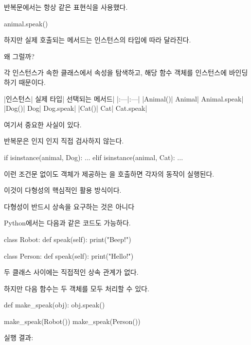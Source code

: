 반복문에서는 항상 같은 표현식을 사용했다.

\begin{dhkcode}
animal.speak()
\end{dhkcode}

하지만 실제 호출되는 메서드는 인스턴스의 타입에 따라 달라진다.

왜 그럴까?

각 인스턴스가 속한 클래스에서  속성을 탐색하고, 해당 함수 객체를 인스턴스에 바인딩하기 때문이다.

\begin{dhktable}
|인스턴스|	실제 타입|	선택되는 메서드|
|:---|:---|
|Animal()|	Animal|	Animal.speak|
|Dog()|	Dog|	Dog.speak|
|Cat()|	Cat|	Cat.speak|
\end{dhktable}

여기서 중요한 사실이 있다.

반복문은 인지 인지 직접 검사하지 않는다.

\begin{dhkcode}
if isinstance(animal, Dog):
    ...
elif isinstance(animal, Cat):
    ...
\end{dhkcode}

이런 조건문 없이도 객체가 제공하는 을 호출하면 각자의 동작이 실행된다.

이것이 다형성의 핵심적인 활용 방식이다.

\begin{dhknote}
\begin{dhksmry}[centered]
다형성이 반드시 상속을 요구하는 것은 아니다
\end{dhksmry}
\end{dhknote}

Python에서는 다음과 같은 코드도 가능하다.

\begin{dhkcode}
class Robot:
    def speak(self):
        print("Beep!")


class Person:
    def speak(self):
        print("Hello!")
\end{dhkcode}

두 클래스 사이에는 직접적인 상속 관계가 없다.

하지만 다음 함수는 두 객체를 모두 처리할 수 있다.

\begin{dhkcode}
def make_speak(obj):
    obj.speak()


make_speak(Robot())
make_speak(Person())
\end{dhkcode}

실행 결과:


